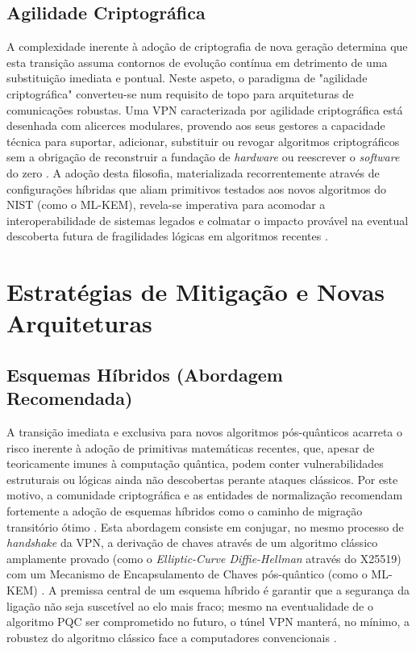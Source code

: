 \documentclass[runningheads]{llncs}
\begin{document}
\subsection{Agilidade Criptográfica}
A complexidade inerente à adoção de criptografia de nova geração determina que esta transição assuma contornos de evolução contínua em detrimento de uma substituição imediata e pontual. Neste aspeto, o paradigma de "agilidade criptográfica" converteu-se num requisito de topo para arquiteturas de comunicações robustas. Uma VPN caracterizada por agilidade criptográfica está desenhada com alicerces modulares, provendo aos seus gestores a capacidade técnica para suportar, adicionar, substituir ou revogar algoritmos criptográficos sem a obrigação de reconstruir a fundação de \textit{hardware} ou reescrever o \textit{software} do zero \cite{kundu2026postquantumcryptographicanalysismessage}. A adoção desta filosofia, materializada recorrentemente através de configurações híbridas que aliam primitivos testados aos novos algoritmos do NIST (como o ML-KEM), revela-se imperativa para acomodar a interoperabilidade de sistemas legados e colmatar o impacto provável na eventual descoberta futura de fragilidades lógicas em algoritmos recentes \cite{oterogarcia2025introducingpostquantumalgorithmsopen}.

\section{Estratégias de Mitigação e Novas Arquiteturas}

\subsection{Esquemas Híbridos (Abordagem Recomendada)}
A transição imediata e exclusiva para novos algoritmos pós-quânticos acarreta o risco inerente à adoção de primitivas matemáticas recentes, que, apesar de teoricamente imunes à computação quântica, podem conter vulnerabilidades estruturais ou lógicas ainda não descobertas perante ataques clássicos. Por este motivo, a comunidade criptográfica e as entidades de normalização recomendam fortemente a adoção de esquemas híbridos como o caminho de migração transitório ótimo \cite{mallick2026studypostquantumstatus}. Esta abordagem consiste em conjugar, no mesmo processo de \textit{handshake} da VPN, a derivação de chaves através de um algoritmo clássico amplamente provado (como o \textit{Elliptic-Curve Diffie-Hellman} através do X25519) com um Mecanismo de Encapsulamento de Chaves pós-quântico (como o ML-KEM) \cite{oterogarcia2025introducingpostquantumalgorithmsopen}. A premissa central de um esquema híbrido é garantir que a segurança da ligação não seja suscetível ao elo mais fraco; mesmo na eventualidade de o algoritmo PQC ser comprometido no futuro, o túnel VPN manterá, no mínimo, a robustez do algoritmo clássico face a computadores convencionais \cite{mallick2026studypostquantumstatus}.
\end{document}
